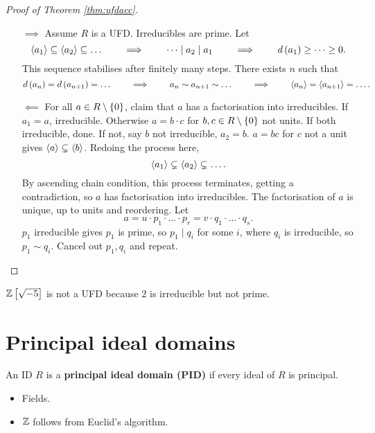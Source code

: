 \begin{proof}[Proof of Theorem \ref{thm:ufdacc}]
\hfill
\begin{itemize}
\item[$ \implies $] Assume $ R $ is a UFD. Irreducibles are prime. Let
$$ \left\langle a_1 \right\rangle \subseteq \left\langle a_2 \right\rangle \subseteq \dots \qquad \implies \qquad \dots \mid a_2 \mid a_1 \qquad \implies \qquad d\left( a_1 \right) \ge \dots \ge 0. $$
This sequence stabilises after finitely many steps. There exists $ n $ such that
$$ d\left( a_n \right) = d\left( a_{n + 1} \right) = \dots \qquad \implies \qquad a_n \sim a_{n + 1} \sim \dots \qquad \implies \qquad \left\langle a_n \right\rangle = \left\langle a_{n + 1} \right\rangle = \dots. $$
\item[$ \impliedby $] For all $ a \in R \setminus \left\{ 0 \right\} $, claim that $ a $ has a factorisation into irreducibles. If $ a_1 = a $, irreducible. Otherwise $ a = b \cdot c $ for $ b, c \in R \setminus \left\{ 0 \right\} $ not units. If both irreducible, done. If not, say $ b $ not irreducible, $ a_2 = b $. $ a = bc $ for $ c $ not a unit gives $ \left\langle a \right\rangle \subsetneq \left\langle b \right\rangle $. Redoing the process here,
$$ \left\langle a_1 \right\rangle \subsetneq \left\langle a_2 \right\rangle \subsetneq \dots. $$
By ascending chain condition, this process terminates, getting a contradiction, so $ a $ has factorisation into irreducibles. The factorisation of $ a $ is unique, up to units and reordering. Let
$$ a = u \cdot p_1 \cdot \dots \cdot p_r = v \cdot q_1 \cdot \dots \cdot q_s. $$
$ p_1 $ irreducible gives $ p_1 $ is prime, so $ p_1 \mid q_i $ for some $ i $, where $ q_i $ is irreducible, so $ p_1 \sim q_i $. Cancel out $ p_1, q_i $ and repeat.
\end{itemize}
\end{proof}

\begin{remark1}
$ \mathbb{Z}\left[ \sqrt{-5} \right] $ is not a UFD because $ 2 $ is irreducible but not prime.
\end{remark1}

\section{Principal ideal domains}

\begin{definition}
An ID $ R $ is a \textbf{principal ideal domain (PID)} if every ideal of $ R $ is principal.
\end{definition}

\begin{example1}
\hfill
\begin{itemize}
\item Fields.
\item $ \mathbb{Z} $ follows from Euclid's algorithm.
\end{itemize}
\end{example1}

